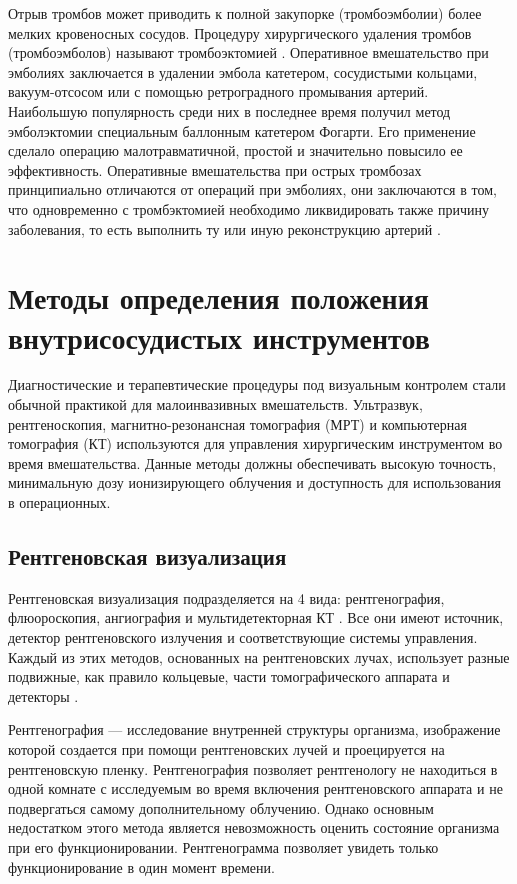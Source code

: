 Отрыв тромбов может приводить к полной закупорке (тромбоэмболии) более мелких кровеносных сосудов. Процедуру хирургического удаления тромбов (тромбоэмболов) называют тромбоэктомией \cite{litlink10}. Оперативное вмешательство при эмболиях заключается в удалении эмбола катетером, сосудистыми кольцами, вакуум-отсосом или с помощью ретроградного промывания артерий. Наибольшую популярность среди них в последнее время получил метод эмболэктомии специальным баллонным катетером Фогарти. Его применение сделало операцию малотравматичной, простой и значительно повысило ее эффективность. Оперативные вмешательства при острых тромбозах принципиально отличаются от операций при эмболиях, они заключаются в том, что одновременно с тромбэктомией необходимо ликвидировать также причину заболевания, то есть выполнить ту или иную реконструкцию артерий \cite{litlink10}.

\section{Методы определения положения внутрисосудистых инструментов}

Диагностические и терапевтические процедуры под визуальным контролем стали обычной практикой для малоинвазивных вмешательств. Ультразвук, рентгеноскопия, магнитно-резонансная томография (МРТ) и компьютерная томография (КТ) используются для управления хирургическим инструментом во время вмешательства. Данные методы должны обеспечивать высокую точность, минимальную дозу ионизирующего облучения и доступность для использования в операционных.

\subsection{Рентгеновская визуализация}

Рентгеновская визуализация подразделяется на 4 вида: рентгенография, флюороскопия, ангиография и мультидетекторная КТ \cite{litlink11}. Все они имеют источник, детектор рентгеновского излучения и соответствующие системы управления. Каждый из этих методов, основанных на рентгеновских лучах, использует разные подвижные, как правило кольцевые, части томографического аппарата и детекторы \cite{litlink11}.

Рентгенография — исследование внутренней структуры организма, изображение которой создается при помощи рентгеновских лучей и проецируется на рентгеновскую пленку. Рентгенография позволяет рентгенологу не находиться в одной комнате с исследуемым во время включения рентгеновского аппарата и не подвергаться самому дополнительному облучению. Однако основным недостатком этого метода является невозможность оценить состояние организма при его функционировании. Рентгенограмма позволяет увидеть только функционирование в один момент времени.

